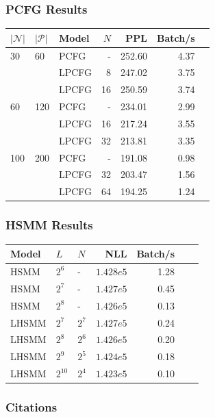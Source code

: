 \documentclass{beamer}
\begin{document}
\begin{frame}
\frametitle{PCFG Results}
\centering
\begin{tabular} {lllrrrr}
\toprule
$|\mathcal{N}|$ & $|\mathcal{P}|$ & Model & $N$ &  PPL & Batch/s\\
\midrule
30  & 60    & PCFG & - & 252.60 & 4.37\\
    &       & LPCFG & 8 &  247.02    & 3.75\\
    &       & LPCFG & 16 & 250.59    & 3.74\\
\midrule
60  & 120   & PCFG & - & 234.01 & 2.99\\
    &       & LPCFG & 16& 217.24 & 3.55\\
    &       & LPCFG & 32& 213.81 & 3.35\\
\midrule
100 & 200   & PCFG & - &  191.08   & 0.98\\
    &       & LPCFG & 32& 203.47 & 1.56\\
    &       & LPCFG & 64& 194.25 & 1.24\\
\bottomrule
\end{tabular}
\end{frame}

\begin{frame}
\frametitle{HSMM Results}
\centering
\begin{tabular} {lllrrrr}
\toprule
Model & $L$ & $N$ & NLL & Batch/s \\
\midrule
HSMM & $2^6$ & - & $1.428e5$ & 1.28 \\
HSMM & $2^7$ & - & $1.427e5$  & 0.45\\
HSMM & $2^8$ & - & $1.426e5$ & 0.13 \\
\midrule
LHSMM & $2^7$ & $2^7$ & $1.427e5$ & 0.24 \\
LHSMM & $2^8$ & $2^6$ & $1.426e5$ & 0.20 \\
LHSMM & $2^9$ & $2^5$ & $1.424e5$ & 0.18 \\
LHSMM & $2^{10}$ & $2^4$ & $1.423e5$ & 0.10 \\
\bottomrule
\end{tabular}
\end{frame}


\begin{frame}
\frametitle{Citations}
\printbibliography
\end{frame}
\end{document}
